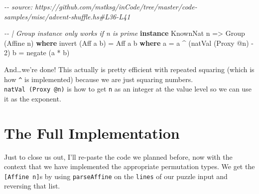 \documentclass[]{article}
\newenvironment{Shaded}{}{}
\newcommand{\CommentTok}[1]{\textcolor[rgb]{0.38,0.63,0.69}{\textit{#1}}}
\newcommand{\DataTypeTok}[1]{\textcolor[rgb]{0.56,0.13,0.00}{#1}}
\newcommand{\DecValTok}[1]{\textcolor[rgb]{0.25,0.63,0.44}{#1}}
\newcommand{\FunctionTok}[1]{\textcolor[rgb]{0.02,0.16,0.49}{#1}}
\newcommand{\KeywordTok}[1]{\textcolor[rgb]{0.00,0.44,0.13}{\textbf{#1}}}
\newcommand{\NormalTok}[1]{#1}
\newcommand{\OperatorTok}[1]{\textcolor[rgb]{0.40,0.40,0.40}{#1}}
\newcommand{\OtherTok}[1]{\textcolor[rgb]{0.00,0.44,0.13}{#1}}
\begin{document}
\begin{Shaded}
\begin{Highlighting}[]
\CommentTok{{-}{-} source: https://github.com/mstksg/inCode/tree/master/code{-}samples/misc/advent{-}shuffle.hs\#L36{-}L41}

\CommentTok{{-}{-} | Group instance only works if n is prime}
\KeywordTok{instance} \DataTypeTok{KnownNat}\NormalTok{ n }\OtherTok{=>} \DataTypeTok{Group}\NormalTok{ (}\DataTypeTok{Affine}\NormalTok{ n) }\KeywordTok{where}
\NormalTok{    invert (}\DataTypeTok{Aff}\NormalTok{ a b) }\OtherTok{=} \DataTypeTok{Aff}\NormalTok{ a\textquotesingle{} b\textquotesingle{}}
      \KeywordTok{where}
\NormalTok{        a\textquotesingle{} }\OtherTok{=}\NormalTok{ a }\OperatorTok{\^{}}\NormalTok{ (natVal (}\DataTypeTok{Proxy} \OperatorTok{@}\NormalTok{n) }\OperatorTok{{-}} \DecValTok{2}\NormalTok{)}
\NormalTok{        b\textquotesingle{} }\OtherTok{=} \FunctionTok{negate}\NormalTok{ (a\textquotesingle{} }\OperatorTok{*}\NormalTok{ b)}
\end{Highlighting}
\end{Shaded}

And\ldots we're done! This actually is pretty efficient with repeated squaring
(which is how \texttt{\^{}} is implemented) because we are just squaring
numbers. \texttt{natVal\ (Proxy\ @n)} is how to get \texttt{n} as an integer at
the value level so we can use it as the exponent.

\hypertarget{the-full-implementation}{%
\section{The Full Implementation}\label{the-full-implementation}}

Just to close us out, I'll re-paste the code we planned before, now with the
context that we have implemented the appropriate permutation types. We get the
\texttt{{[}Affine\ n{]}}s by using \texttt{parseAffine} on the \texttt{lines} of
our puzzle input and reversing that list.
\end{document}
